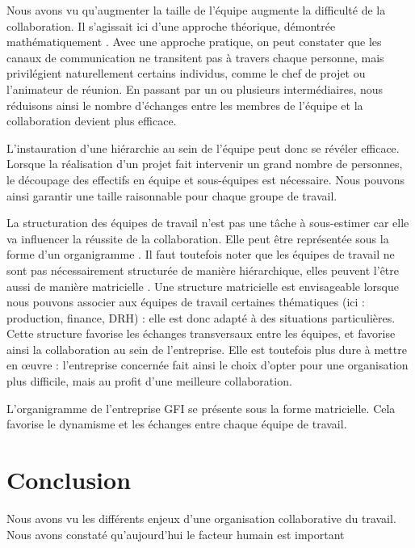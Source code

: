 Nous avons vu qu'augmenter la taille de l'équipe augmente la difficulté de la collaboration. Il s'agissait ici d'une approche théorique, démontrée mathématiquement . Avec une approche pratique, on peut constater que les canaux de communication ne transitent pas à travers chaque personne, mais privilégient naturellement certains individus, comme le chef de projet ou l'animateur de réunion. En passant par un ou plusieurs intermédiaires, nous réduisons ainsi le nombre d'échanges entre les membres de l'équipe et la collaboration devient plus efficace.

L'instauration d'une hiérarchie au sein de l'équipe peut donc se révéler efficace. Lorsque la réalisation d'un projet fait intervenir un grand nombre de personnes, le découpage des effectifs en équipe et sous-équipes est nécessaire. Nous pouvons ainsi garantir une taille raisonnable pour chaque groupe de travail.


La structuration des équipes de travail n'est pas une tâche à sous-estimer car elle va influencer la réussite de la collaboration. Elle peut être représentée sous la forme d'un organigramme . Il faut toutefois noter que les équipes de travail ne sont pas nécessairement structurée de manière hiérarchique, elles peuvent l'être aussi de manière matricielle . Une structure matricielle est envisageable lorsque nous pouvons associer aux équipes de travail certaines thématiques (ici : production, finance, DRH) : elle est donc adapté à des situations particulières. Cette structure favorise les échanges transversaux entre les équipes, et favorise ainsi la collaboration au sein de l'entreprise. Elle est toutefois plus dure à mettre en œuvre : l'entreprise concernée fait ainsi le choix d'opter pour une organisation plus difficile, mais au profit d'une meilleure collaboration.


\begin{app}
L'organigramme de l'entreprise GFI se présente sous la forme matricielle. Cela favorise le dynamisme et les échanges entre chaque équipe de travail.
\end{app}

\section{Conclusion}

Nous avons vu les différents enjeux d'une organisation collaborative du travail. Nous avons constaté qu'aujourd'hui le facteur humain est important
